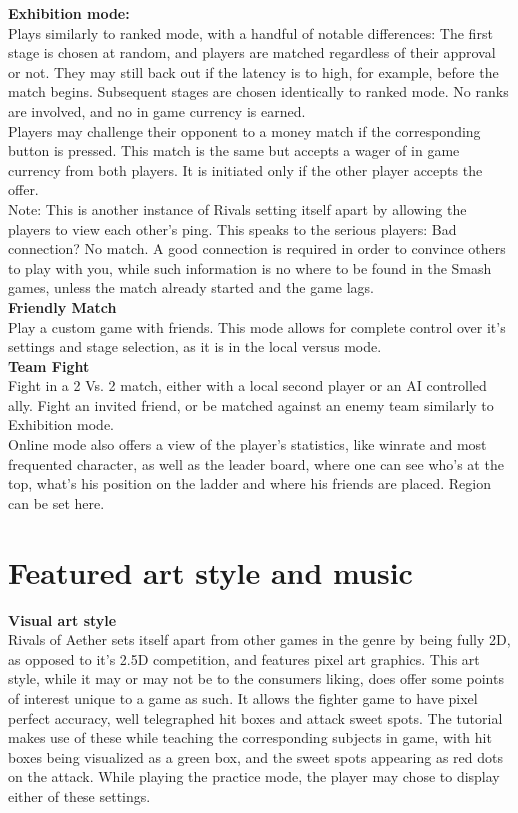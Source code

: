 \documentclass{article}
\begin{document}
\textbf{Exhibition mode:}\\
Plays similarly to ranked mode, with a handful of notable differences: The first stage is chosen at random, and players are matched regardless of their approval or not. They may still back out if the latency is to high, for example, before the match begins. Subsequent stages are chosen identically to ranked mode. No ranks are involved, and no in game currency is earned.\\
Players may challenge their opponent to a money match if the corresponding button is pressed. This match is the same but accepts a wager of in game currency from both players. It is initiated only if the other player accepts the offer.\\

Note: This is another instance of Rivals setting itself apart by allowing the players to view each other's ping. This speaks to the serious players: Bad connection? No match. A good connection is required in order to convince others to play with you, while such information is no where to be found in the Smash games, unless the match already started and the game lags.\\

\textbf{Friendly Match}\\
Play a custom game with friends. This mode allows for complete control over it's settings and stage selection, as it is in the local versus mode.
\\
\textbf{Team Fight}\\
Fight in a 2 Vs. 2 match, either with a local second player or an AI controlled ally. Fight an invited friend, or be matched against an enemy team similarly to Exhibition mode.
\\

Online mode also offers a view of the player's statistics, like winrate and most frequented character, as well as the leader board, where one can see who's at the top, what's his position on the ladder and where his friends are placed. Region can be set here.\\


\chapter{Featured art style and music}

\textbf{Visual art style}\\
Rivals of Aether sets itself apart from other games in the genre by being fully 2D, as opposed to it's 2.5D competition, and features pixel art graphics. This art style, while it may or may not be to the consumers liking, does offer some points of interest unique to a game as such. It allows the fighter game to have pixel perfect accuracy, well telegraphed hit boxes and attack sweet spots. The tutorial makes use of these while teaching the corresponding subjects in game, with hit boxes being visualized as a green box, and the sweet spots appearing as red dots on the attack.
While playing the practice mode, the player may chose to display either of these settings.\\
\end{document}
